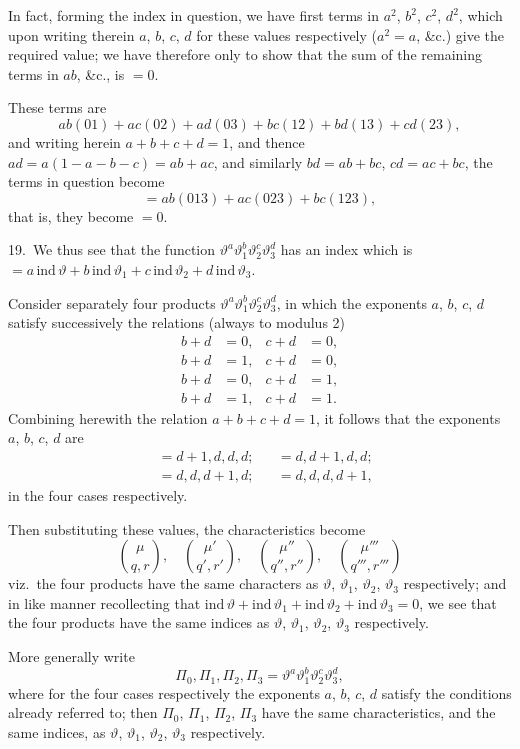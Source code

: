 \documentclass[11pt,a4paper]{article}
\theoremstyle{definition}
\begin{document}
In fact, forming the index in question, we have first terms in $a^2$, $b^2$, $c^2$, $d^2$, which upon writing therein $a$, $b$, $c$, $d$ for these values respectively ($a^2 = a$, \&c.) give the required value; we have therefore only to show that the sum of the remaining terms in $ab$, \&c., is $= 0$.

These terms are
\[
ab(01) + ac(02) + ad(03) + bc(12) + bd(13) + cd(23),
\]
and writing herein $a + b + c + d = 1$, and thence $ad = a(1 - a - b - c) = ab + ac$, and similarly $bd = ab + bc$, $cd = ac + bc$, the terms in question become
\[
= ab(013) + ac(023) + bc(123),
\]
that is, they become $= 0$.

\medskip

19.\ We thus see that the function $\vartheta^a\vartheta_1^b\vartheta_2^c\vartheta_3^d$ has an index which is $= a\,\text{ind}\,\vartheta + b\,\text{ind}\,\vartheta_1 + c\,\text{ind}\,\vartheta_2 + d\,\text{ind}\,\vartheta_3$.

Consider separately four products $\vartheta^a\vartheta_1^b\vartheta_2^c\vartheta_3^d$, in which the exponents $a$, $b$, $c$, $d$ satisfy successively the relations (always to modulus 2)
\begin{align*}
b + d &= 0, & c + d &= 0,\\
b + d &= 1, & c + d &= 0,\\
b + d &= 0, & c + d &= 1,\\
b + d &= 1, & c + d &= 1.
\end{align*}
Combining herewith the relation $a + b + c + d = 1$, it follows that the exponents $a$, $b$, $c$, $d$ are
\begin{align*}
&= d + 1, d, d, d; & &= d, d + 1, d, d;\\
&= d, d, d + 1, d; & &= d, d, d, d + 1,
\end{align*}
in the four cases respectively.

Then substituting these values, the characteristics become
\[
\binom{\mu}{q, r}, \quad \binom{\mu'}{q', r'}, \quad \binom{\mu''}{q'', r''}, \quad \binom{\mu'''}{q''', r'''}
\]
viz.\ the four products have the same characters as $\vartheta$, $\vartheta_1$, $\vartheta_2$, $\vartheta_3$ respectively; and in like manner recollecting that $\text{ind}\,\vartheta + \text{ind}\,\vartheta_1 + \text{ind}\,\vartheta_2 + \text{ind}\,\vartheta_3 = 0$, we see that the four products have the same indices as $\vartheta$, $\vartheta_1$, $\vartheta_2$, $\vartheta_3$ respectively.

More generally write
\[
\Pi_0, \Pi_1, \Pi_2, \Pi_3 = \vartheta^a\vartheta_1^b\vartheta_2^c\vartheta_3^d,
\]
where for the four cases respectively the exponents $a$, $b$, $c$, $d$ satisfy the conditions already referred to; then $\Pi_0$, $\Pi_1$, $\Pi_2$, $\Pi_3$ have the same characteristics, and the same indices, as $\vartheta$, $\vartheta_1$, $\vartheta_2$, $\vartheta_3$ respectively.
\end{document}
